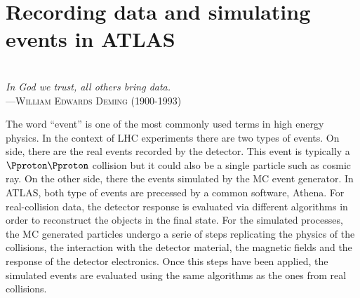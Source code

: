 \begin{comment}
%
%
asdf
\end{comment}

\chapter{Recording data and simulating events in ATLAS}
\label{chap:DataAndMC}

\vspace*{0.1 cm} 
\hspace*{200pt} \\
\hspace*{120pt} \textit{In God we trust, all others bring data.} \\
\hspace*{140pt} ---\textsc{William Edwards Deming (1900-1993)} \\%
\vspace*{2cm} 


The word ``event'' is one of the most commonly used terms in high energy physics.
In the context of LHC experiments there are two types of events. On side, there
are the real events recorded by the detector. This event is typically a 
$\Pproton \Pproton$ collision but it could also be a single particle such as
cosmic ray. On the other side, there the events simulated by the MC 
event generator. In ATLAS, both type of events are precessed by a common
software, Athena.
For real-collision data, the detector response is evaluated via different algorithms
in order to reconstruct the objects in the final state. For the simulated processes,
the MC generated particles undergo a serie of steps replicating the physics of
the collisions, the interaction with the detector material, the magnetic fields and
the response of the detector electronics. Once this steps have been applied,
the simulated events are evaluated using the same algorithms as the ones 
from real collisions.



